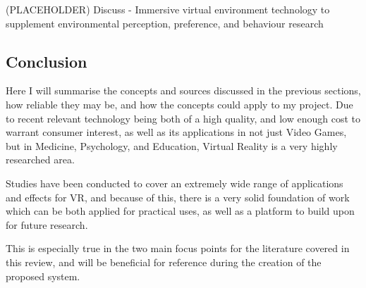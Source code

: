 		
		
		(PLACEHOLDER) Discuss \cite{smith2015} - Immersive virtual environment technology to supplement environmental perception, preference, and behaviour research
		
	\subsection{Conclusion}
	\label{lr:vr:conclusion}
		Here I will summarise the concepts and sources discussed in the previous sections, how reliable they may be, and how the concepts could apply to my project.
		Due to recent relevant technology being both of a high quality, and low enough cost to warrant consumer interest, as well as its applications in not just Video Games, but in Medicine, Psychology, and Education, Virtual Reality is a very highly researched area.
		
		Studies have been conducted to cover an extremely wide range of applications and effects for VR, and because of this, there is a very solid foundation of work which can be both applied for practical uses, as well as a platform to build upon for future research.
		
		This is especially true in the two main focus points for the literature covered in this review, and will be beneficial for reference during the creation of the proposed system.
	
